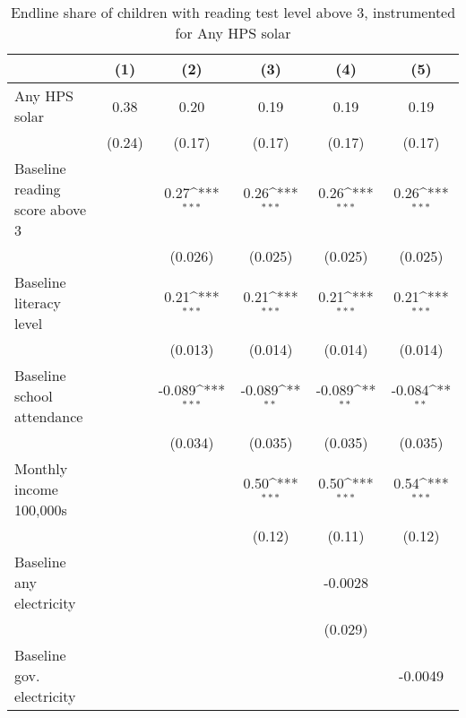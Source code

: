 \begin{table}[htbp]\centering
\def\sym#1{\ifmmode^{#1}\else\(^{#1}\)\fi}
\caption{Endline share of children with reading test level above 3, instrumented for Any HPS solar}
\begin{tabular*}{1\hsize}{@{\hskip\tabcolsep\extracolsep\fill}l*{5}{c}}
\toprule
                &\multicolumn{1}{c}{(1)}         &\multicolumn{1}{c}{(2)}         &\multicolumn{1}{c}{(3)}         &\multicolumn{1}{c}{(4)}         &\multicolumn{1}{c}{(5)}         \\
\midrule
Any HPS solar   &     0.38         &     0.20         &     0.19         &     0.19         &     0.19         \\
                &   (0.24)         &   (0.17)         &   (0.17)         &   (0.17)         &   (0.17)         \\
Baseline reading score above 3&                  &     0.27\sym{***}&     0.26\sym{***}&     0.26\sym{***}&     0.26\sym{***}\\
                &                  &  (0.026)         &  (0.025)         &  (0.025)         &  (0.025)         \\
Baseline literacy level&                  &     0.21\sym{***}&     0.21\sym{***}&     0.21\sym{***}&     0.21\sym{***}\\
                &                  &  (0.013)         &  (0.014)         &  (0.014)         &  (0.014)         \\
Baseline school attendance&                  &   -0.089\sym{***}&   -0.089\sym{**} &   -0.089\sym{**} &   -0.084\sym{**} \\
                &                  &  (0.034)         &  (0.035)         &  (0.035)         &  (0.035)         \\
Monthly income 100,000s&                  &                  &     0.50\sym{***}&     0.50\sym{***}&     0.54\sym{***}\\
                &                  &                  &   (0.12)         &   (0.11)         &   (0.12)         \\
Baseline any electricity&                  &                  &                  &  -0.0028         &                  \\
                &                  &                  &                  &  (0.029)         &                  \\
Baseline gov. electricity&                  &                  &                  &                  &  -0.0049         \\

\end{tabular*}
\end{table}
